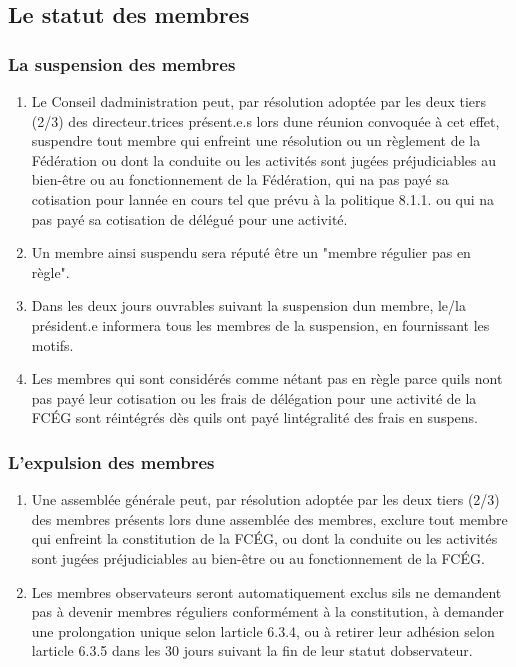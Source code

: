 \subsection{Le statut des membres}
\label{le-statut-des-membres}

\subsubsection{La suspension des membres}
\label{la-suspension-des-membres}

\begin{enumerate}
 \item
  Le Conseil d\textquotesingle administration peut, par résolution adoptée par les deux tiers (2/3) des directeur.trices présent.e.s lors d\textquotesingle une réunion convoquée à cet effet, suspendre tout membre qui enfreint une résolution ou un règlement de la Fédération ou dont la conduite ou les activités sont jugées préjudiciables au bien-être ou au fonctionnement de la Fédération, qui n\textquotesingle a pas payé sa cotisation pour l\textquotesingle année en cours tel que prévu à la politique 8.1.1. ou qui n\textquotesingle a pas payé sa cotisation de délégué pour une activité.
 \item
  Un membre ainsi suspendu sera réputé être un "membre régulier pas en règle".
 \item
  Dans les deux jours ouvrables suivant la suspension d\textquotesingle un membre, le/la président.e informera tous les membres de la suspension, en fournissant les motifs.
 \item
  Les membres qui sont considérés comme n\textquotesingle étant pas en règle parce qu\textquotesingle ils n\textquotesingle ont pas payé leur cotisation ou les frais de délégation pour une activité de la FCÉG sont réintégrés dès qu\textquotesingle ils ont payé l\textquotesingle intégralité des frais en suspens.
\end{enumerate}

\subsubsection{L'expulsion des membres}
\label{lexpulsion-des-membres}

\begin{enumerate}
 \item
  Une assemblée générale peut, par résolution adoptée par les deux tiers (2/3) des membres présents lors d\textquotesingle une assemblée des membres, exclure tout membre qui enfreint la constitution de la FCÉG, ou dont la conduite ou les activités sont jugées préjudiciables au bien-être ou au fonctionnement de la FCÉG.
 \item
  Les membres observateurs seront automatiquement exclus s\textquotesingle ils ne demandent pas à devenir membres réguliers conformément à la constitution, à demander une prolongation unique selon l\textquotesingle article 6.3.4, ou à retirer leur adhésion selon l\textquotesingle article 6.3.5 dans les 30 jours suivant la fin de leur statut d\textquotesingle observateur.
\end{enumerate}

